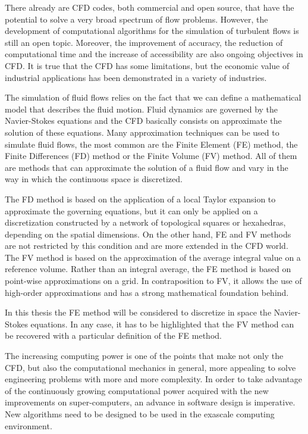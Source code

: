 There already are CFD codes, both commercial and open source, that have the potential to solve a very broad spectrum of flow problems. However, the development of computational algorithms for the simulation of turbulent flows is still an open topic. Moreover, the improvement of accuracy, the reduction of computational time and the increase of accessibility are also ongoing objectives in CFD. It is true that the CFD has some limitations, but the economic value of industrial applications has been demonstrated in a variety of industries.

The simulation of fluid flows relies on the fact that we can define a mathematical model that describes the fluid motion. Fluid dynamics are governed by the Navier-Stokes equations and the CFD basically consists on approximate the solution of these equations. Many approximation techniques can be used to simulate fluid flows, the most common are the Finite Element (FE) method, the Finite Differences (FD) method or the Finite Volume (FV) method. All of them are methods that can approximate the solution of a fluid flow and vary in the way in which the continuous space is discretized. 

The FD method is based on the application of a local Taylor expansion to approximate the governing equations, but it can only be applied on a discretization constructed by a network of topological squares or hexahedras, depending on the spatial dimensions. On the other hand, FE and FV methods are not restricted by this condition and are more extended in the CFD world. The FV method is based on the approximation of the average integral value on a reference volume. Rather than an integral average, the FE method is based on point-wise approximations on a grid. In contraposition to FV, it allows the use of high-order approximations and has a strong mathematical foundation behind.

In this thesis the FE method will be considered to discretize in space the Navier-Stokes equations. In any case, it has to be highlighted that the FV method can be recovered with a particular definition of the FE method.

The increasing computing power is one of the points that make not only the CFD, but also the computational mechanics in general, more appealing to solve engineering problems with more and more complexity. In order to take advantage of the continuously growing computational power acquired with the new improvements on super-computers, an advance in software design is imperative. New algorithms need to be designed to be used in the exascale computing environment. 

